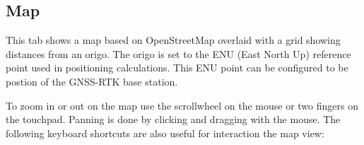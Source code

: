 \documentclass[12pt]{article} %
\newcommand{\todo}[1]{{\color{red} \textbf{TODO:} #1}}
\begin{document}



\subsection{Map}

This tab shows a map based on OpenStreetMap overlaid with a grid
showing distances from an origo. The origo is set to the ENU (East
North Up) reference point used in positioning calculations. This ENU
point can be configured to be postion of the GNSS-RTK base station.

To zoom in or out on the map use the scrollwheel on the mouse or two
fingers on the touchpad. Panning is done by clicking and dragging
with the mouse. The following keyboard shortcuts are also useful for
interaction the map view:
\end{document}
